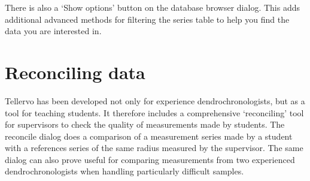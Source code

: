 There is also a `Show options' button on the database browser dialog.  This adds additional advanced methods for filtering the series table to help you find the data you are interested in.

\section{Reconciling data}
Tellervo has been developed not only for experience dendrochronologists, but as a tool for teaching students.  It therefore includes a comprehensive `reconciling' tool for supervisors to check the quality of measurements made by students.  The reconcile dialog does a comparison of a measurement series made by a student with a references series of the same radius measured by the supervisor.  The same dialog can also prove useful for comparing measurements from two experienced dendrochronologists when handling particularly difficult samples.

 


